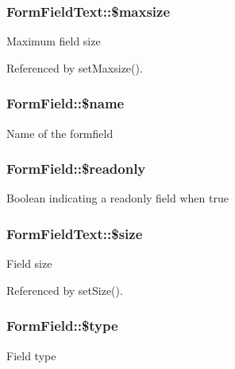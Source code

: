 \subsubsection[{\$maxsize}]{\setlength{\rightskip}{0pt plus 5cm}FormFieldText::\$maxsize}\label{classFormFieldText_ac984f8586351de82eb4a461f053d5329}
Maximum field size 

Referenced by setMaxsize().

\subsubsection[{\$name}]{\setlength{\rightskip}{0pt plus 5cm}FormField::\$name}\label{classFormField_a23861f707bcd77bbace6300de9621746}
Name of the formfield 
\subsubsection[{\$readonly}]{\setlength{\rightskip}{0pt plus 5cm}FormField::\$readonly}\label{classFormField_a78ba5d4b9127e75e8ccf86f397b5d9ac}
Boolean indicating a readonly field when true 
\subsubsection[{\$size}]{\setlength{\rightskip}{0pt plus 5cm}FormFieldText::\$size}\label{classFormFieldText_a1db9cf2b51d60717eab0d295e97bcd5b}
Field size 

Referenced by setSize().

\subsubsection[{\$type}]{\setlength{\rightskip}{0pt plus 5cm}FormField::\$type}\label{classFormField_a37bed21a1891e95be0e4a697e45ba51b}
Field type 

